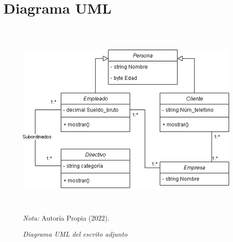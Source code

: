 \documentclass[stu, 12pt, letterpaper, donotrepeattitle, floatsintext, natbib]{apa7}
\begin{document}
\section{Diagrama UML}    
\begin{figure}[H]
    \caption{\emph{Diagrama UML del escrito adjunto\\}}
    \centering
    \smallskip
    \includegraphics[width=14cm, height=10cm]{Ejercicio1_.drawio.png}
    \bigskip
    {\justifying\small\textit{\\Nota:} Autoría Propia (2022).}%
\end{figure}
\vspace{\baselineskip}
\end{document}
